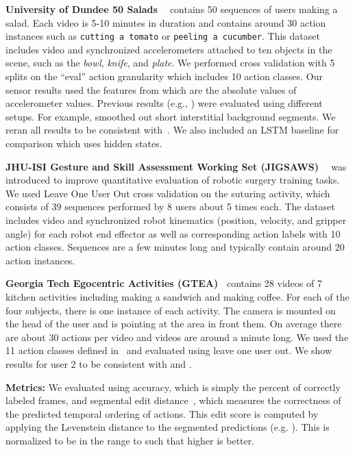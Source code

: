 \documentclass[10pt,twocolumn,letterpaper]{article}
\newcommand{\fakesubsection}[1]{\smallskip\noindent\textbf{#1:}}
\begin{document}
\textbf{University of Dundee 50 Salads ~\cite{stein_ubicomp_2013}}
 contains 50 sequences of users making a salad. Each video is 5-10 minutes in duration and contains around 30 action instances such as \texttt{cutting a tomato} or \texttt{peeling a cucumber}. This dataset includes video and synchronized accelerometers attached to ten objects in the scene, such as the \textit{bowl}, \textit{knife}, and \textit{plate}. We performed cross validation with 5 splits on the ``eval'' action granularity which includes 10 action classes.
Our sensor results used the features from \cite{lea_icra_2016} which are the absolute values of accelerometer values. 
Previous results (e.g., \cite{lea_icra_2016,richard_cvpr_2016}) were evaluated using different setups. For example, \cite{lea_icra_2016} smoothed out short interstitial background segments. We reran all results to be consistent with~\cite{richard_cvpr_2016}. We also included an LSTM baseline for comparison which uses  hidden states. 




\textbf{JHU-ISI Gesture and Skill Assessment Working Set (JIGSAWS) ~\cite{JIGSAWS}}
was introduced to improve quantitative evaluation of robotic surgery training tasks. 
We used Leave One User Out cross validation on the suturing activity, which consists of 39 sequences performed by 8 users about 5 times each. The dataset includes video and synchronized robot kinematics (position, velocity, and gripper angle) for each robot end effector as well as corresponding action labels with 10 action classes. Sequences are a few minutes long and typically contain around 20 action instances.

\textbf{Georgia Tech Egocentric Activities (GTEA)~\cite{fathi_cvpr_2011}}
contains 28 videos of 7 kitchen activities including making a sandwich and making coffee. For each of the four subjects, there is one instance of each activity.
The camera is mounted on the head of the user and is pointing at the area in front them. 
On average there are about 30 actions per video and videos are around a minute long. We used the 11 action classes defined in~\cite{fathi_iccv_2011} and evaluated using leave one user out. We show results for user 2 to be consistent with \cite{fathi_iccv_2011} and \cite{singh_cvpr_2016b}.






\fakesubsection{Metrics}
We evaluated using accuracy, which is simply the percent of correctly labeled frames, and segmental edit distance~\cite{lea_icra_2016}, which measures the correctness of the predicted temporal ordering of actions.
This edit score is computed by applying the Levenstein distance to the segmented predictions (e.g. ). This is normalized to be in the range  to  such that higher is better. 
\end{document}

